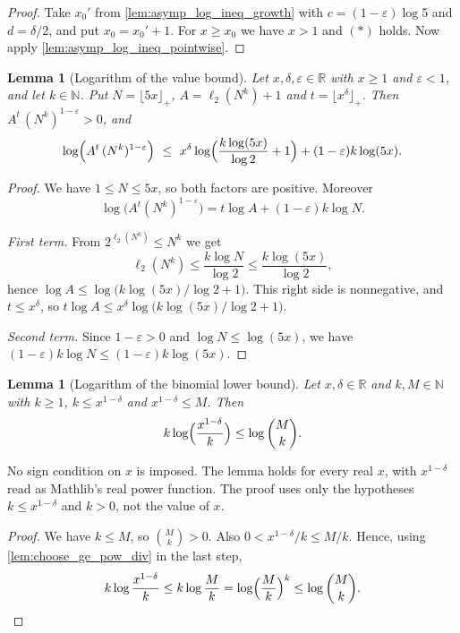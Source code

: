 \documentclass[11pt]{article}
\newtheorem{lemma}[theorem]{Lemma}
\theoremstyle{definition}
\theoremstyle{remark}
\newcommand{\floorp}[1]{\lfloor #1\rfloor_{+}}
\newcommand{\ltwo}{\ell_{2}}
\begin{document}
\begin{proof}
Take $x_0'$ from \cref{lem:asymp_log_ineq_growth} with $c=(1-\varepsilon)\log5$ and $d=\delta/2$, and put $x_0=x_0'+1$. For $x\ge x_0$ we have $x>1$ and $(\ast)$ holds. Now apply \cref{lem:asymp_log_ineq_pointwise}.
\end{proof}

\begin{lemma}[Logarithm of the value bound]\label{lem:asymp_main_lhs_log}
Let $x,\delta,\varepsilon\in\mathbb{R}$ with $x\ge1$ and $\varepsilon<1$, and let $k\in\mathbb{N}$. Put $N=\floorp{5x}$, $A=\ltwo(N^k)+1$ and $t=\floorp{x^\delta}$. Then $A^{t}\,(N^k)^{1-\varepsilon}>0$, and
\[
\log\Bigl(A^{t}\,(N^k)^{1-\varepsilon}\Bigr)\ \le\ x^\delta\log\Bigl(\frac{k\log(5x)}{\log2}+1\Bigr)+(1-\varepsilon)k\log(5x).
\]
\end{lemma}

\begin{proof}
We have $1\le N\le5x$, so both factors are positive. Moreover
\[
\log\bigl(A^t(N^k)^{1-\varepsilon}\bigr)=t\log A+(1-\varepsilon)k\log N .
\]

\emph{First term.} From $2^{\ltwo(N^k)}\le N^k$ we get
\[
\ltwo(N^k)\le\frac{k\log N}{\log2}\le\frac{k\log(5x)}{\log2},
\]
hence $\log A\le\log\bigl(k\log(5x)/\log2+1\bigr)$. This right side is nonnegative, and $t\le x^\delta$, so $t\log A\le x^\delta\log\bigl(k\log(5x)/\log2+1\bigr)$.

\emph{Second term.} Since $1-\varepsilon>0$ and $\log N\le\log(5x)$, we have $(1-\varepsilon)k\log N\le(1-\varepsilon)k\log(5x)$.
\end{proof}

\begin{lemma}[Logarithm of the binomial lower bound]\label{lem:asymp_main_rhs_log}
Let $x,\delta\in\mathbb{R}$ and $k,M\in\mathbb{N}$ with $k\ge1$, $k\le x^{1-\delta}$ and $x^{1-\delta}\le M$. Then
\[
k\log\Bigl(\frac{x^{1-\delta}}{k}\Bigr)\le\log\binom{M}{k}.
\]
\end{lemma}

No sign condition on $x$ is imposed. The lemma holds for every real $x$, with $x^{1-\delta}$ read as Mathlib's real power function. The proof uses only the hypotheses $k\le x^{1-\delta}$ and $k>0$, not the value of $x$.

\begin{proof}
We have $k\le M$, so $\binom Mk>0$. Also $0<x^{1-\delta}/k\le M/k$. Hence, using \cref{lem:choose_ge_pow_div} in the last step,
\[
k\log\frac{x^{1-\delta}}{k}\le k\log\frac Mk=\log\Bigl(\frac Mk\Bigr)^k\le\log\binom Mk. \qedhere
\]
\end{proof}
\end{document}
